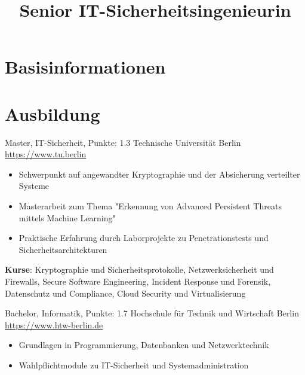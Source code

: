 \documentclass[a4paper, serif, 10pt]{moderncv}
\title{Senior IT-Sicherheitsingenieurin}
\begin{document}
\maketitle

\section{Basisinformationen}

\section{Ausbildung}

        {Master, IT-Sicherheit, Punkte: 1.3}
        {Technische Universität Berlin}
        {\url{https://www.tu.berlin}}
        {}
        {\begin{itemize}
\item Schwerpunkt auf angewandter Kryptographie und der Absicherung verteilter Systeme
\item Masterarbeit zum Thema "Erkennung von Advanced Persistent Threats mittels Machine Learning"
\item Praktische Erfahrung durch Laborprojekte zu Penetrationstests und Sicherheitsarchitekturen
\end{itemize}
\textbf{Kurse}: Kryptographie und Sicherheitsprotokolle, Netzwerksicherheit und Firewalls, Secure Software Engineering, Incident Response und Forensik, Datenschutz und Compliance, Cloud Security und Virtualisierung}

        {Bachelor, Informatik, Punkte: 1.7}
        {Hochschule für Technik und Wirtschaft Berlin}
        {\url{https://www.htw-berlin.de}}
        {}
        {\begin{itemize}
\item Grundlagen in Programmierung, Datenbanken und Netzwerktechnik
\item Wahlpflichtmodule zu IT-Sicherheit und Systemadministration
\end{itemize}}
\end{document}
